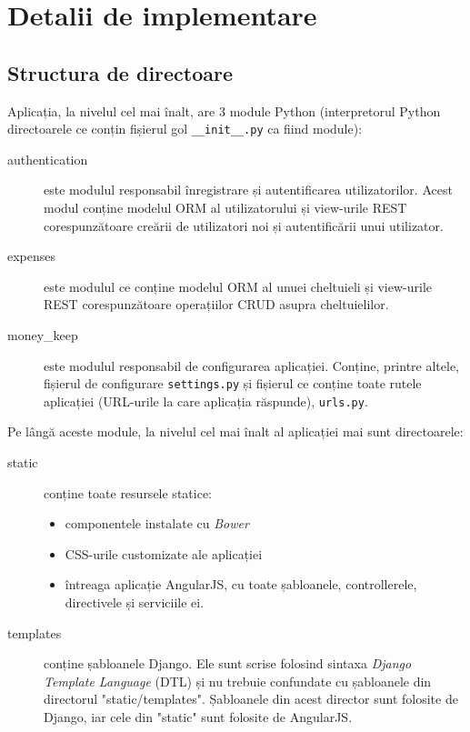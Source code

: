 \chapter{Detalii de implementare}

\section{Structura de directoare}

Aplicația, la nivelul cel mai înalt, are 3 module Python (interpretorul
Python directoarele ce conțin fișierul gol \texttt{\_\_init\_\_.py} ca
fiind module):
\begin{description}
\item [authentication] este modulul responsabil înregistrare și autentificarea
utilizatorilor. Acest modul conține modelul ORM al utilizatorului și
view-urile REST corespunzătoare creării de utilizatori noi și
autentificării unui utilizator.
\item [expenses] este modulul ce conține modelul ORM al unuei cheltuieli
și view-urile REST corespunzătoare operațiilor CRUD asupra
cheltuielilor.
\item [money\_keep] este modulul responsabil de configurarea aplicației.
Conține, printre altele, fișierul de configurare \texttt{settings.py}
și fișierul ce conține toate rutele aplicației (URL-urile la 
care aplicația răspunde), \texttt{urls.py}.
\end{description}

Pe lângă aceste module, la nivelul cel mai înalt al aplicației
mai sunt directoarele:

\begin{description}
\item [static] conține toate resursele statice: 
  \begin{itemize}
  \item componentele instalate cu \emph{Bower}
  \item CSS-urile customizate ale aplicației
  \item întreaga aplicație AngularJS, cu toate șabloanele,
  controllerele, directivele și serviciile ei.
  \end{itemize}
\item [templates] conține șabloanele Django. Ele sunt scrise
folosind sintaxa \emph{Django Template Language} (DTL) și nu trebuie confundate
cu șabloanele din directorul "static/templates". Șabloanele din
acest director sunt folosite de Django, iar cele din "static" sunt
folosite de AngularJS.
\end{description}

